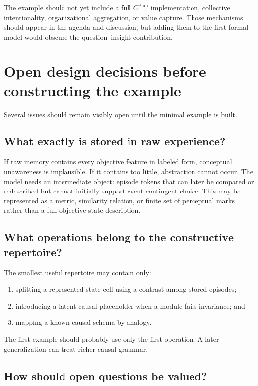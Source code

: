 \documentclass[11pt]{article}
\newcommand{\cplan}{C^{\mathrm{Plan}}}
\begin{document}
	The example should not yet include a full $\cplan$ implementation, collective intentionality, organizational aggregation, or value capture.  Those mechanisms should appear in the agenda and discussion, but adding them to the first formal model would obscure the question--insight contribution.
	
	\section{Open design decisions before constructing the example}
	
	Several issues should remain visibly open until the minimal example is built.
	
	\subsection{What exactly is stored in raw experience?}
	
	If raw memory contains every objective feature in labeled form, conceptual unawareness is implausible.  If it contains too little, abstraction cannot occur.  The model needs an intermediate object: episode tokens that can later be compared or redescribed but cannot initially support event-contingent choice.  This may be represented as a metric, similarity relation, or finite set of perceptual marks rather than a full objective state description.
	
	\subsection{What operations belong to the constructive repertoire?}
	
	The smallest useful repertoire may contain only:
	\begin{enumerate}
		\item splitting a represented state cell using a contrast among stored episodes;
		\item introducing a latent causal placeholder when a module fails invariance; and
		\item mapping a known causal schema by analogy.
	\end{enumerate}
	The first example should probably use only the first operation.  A later generalization can treat richer causal grammar.
	
	\subsection{How should open questions be valued?}
	
\end{document}
